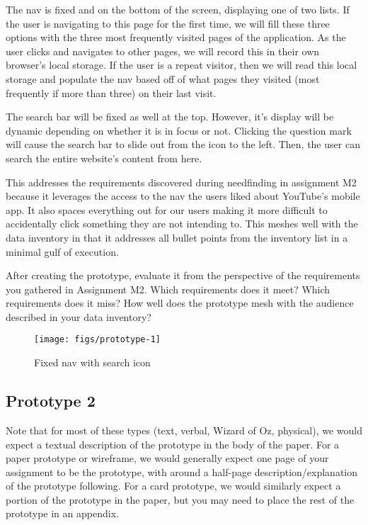 The nav is fixed and on the bottom of the screen, displaying one of two lists. If the user is navigating to this page for the first time, we will fill these three options with the three most frequently visited pages of the application. As the user clicks and navigates to other pages, we will record this in their own browser's local storage. If the user is a repeat visitor, then we will read this local storage and populate the nav based off of what pages they visited (most frequently if more than three) on their last visit.

The search bar will be fixed as well at the top. However, it's display will be dynamic depending on whether it is in focus or not. Clicking the question mark will cause the search bar to slide out from the icon to the left. Then, the user can search the entire website's content from here.

This addresses the requirements discovered during needfinding in assignment M2 because it leverages the access to the nav the users liked about YouTube's mobile app. It also spaces everything out for our users making it more difficult to accidentally click something they are not intending to. This meshes well with the data inventory in that it addresses all bullet points from the inventory list in a minimal gulf of execution.

After creating the prototype, evaluate it from the perspective of the requirements you gathered in Assignment M2. Which requirements does it meet? Which requirements does it miss? How well does the prototype mesh with the audience described in your data inventory?

\begin{figure}[H]
  \centering
  \texttt{[image: figs/prototype-1]}
  \caption{Fixed nav with search icon}
  \label{fig::1}
\end{figure}


\subsection{Prototype 2}
Note that for most of these types (text, verbal, Wizard of Oz, physical), we would expect a textual description of the prototype in the body of the paper. For a paper prototype or wireframe, we would generally expect one page of your assignment to be the prototype, with around a half-page description/explanation of the prototype following. For a card prototype, we would similarly expect a portion of the prototype in the paper, but you may need to place the rest of the prototype in an appendix.

